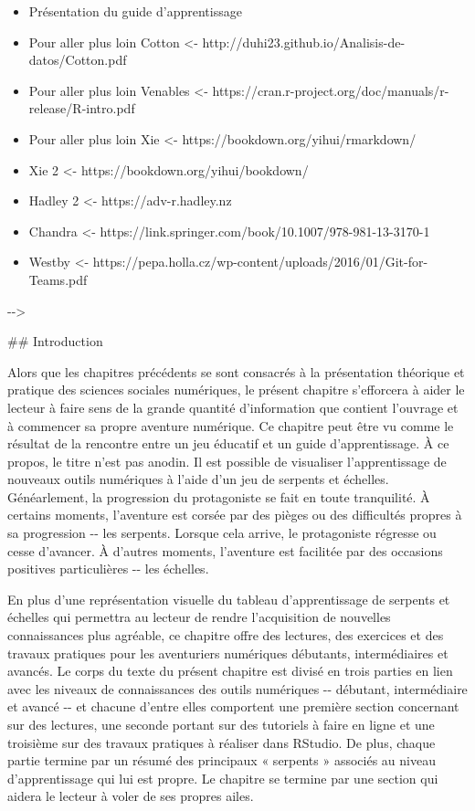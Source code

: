 \documentclass[
  letterpaper,
]{scrbook}
\begin{document}
\begin{itemize}
\item
  Présentation du guide d'apprentissage
\item
  Pour aller plus loin Cotton \textless-
  http://duhi23.github.io/Analisis-de-datos/Cotton.pdf
\item
  Pour aller plus loin Venables \textless-
  https://cran.r-project.org/doc/manuals/r-release/R-intro.pdf
\item
  Pour aller plus loin Xie \textless-
  https://bookdown.org/yihui/rmarkdown/
\item
  Xie 2 \textless- https://bookdown.org/yihui/bookdown/
\item
  Hadley 2 \textless- https://adv-r.hadley.nz
\item
  Chandra \textless-
  https://link.springer.com/book/10.1007/978-981-13-3170-1
\item
  Westby \textless-
  https://pepa.holla.cz/wp-content/uploads/2016/01/Git-for-Teams.pdf
\end{itemize}

-\/-\textgreater{}

\#\# Introduction

Alors que les chapitres précédents se sont consacrés à la présentation
théorique et pratique des sciences sociales numériques, le présent
chapitre s'efforcera à aider le lecteur à faire sens de la grande
quantité d'information que contient l'ouvrage et à commencer sa propre
aventure numérique. Ce chapitre peut être vu comme le résultat de la
rencontre entre un jeu éducatif et un guide d'apprentissage. À ce
propos, le titre n'est pas anodin. Il est possible de visualiser
l'apprentissage de nouveaux outils numériques à l'aide d'un jeu de
serpents et échelles. Généarlement, la progression du protagoniste se
fait en toute tranquilité. À certains moments, l'aventure est corsée par
des pièges ou des difficultés propres à sa progression -\/- les
serpents. Lorsque cela arrive, le protagoniste régresse ou cesse
d'avancer. À d'autres moments, l'aventure est facilitée par des
occasions positives particulières -\/- les échelles.

En plus d'une représentation visuelle du tableau d'apprentissage de
serpents et échelles qui permettra au lecteur de rendre l'acquisition de
nouvelles connaissances plus agréable, ce chapitre offre des lectures,
des exercices et des travaux pratiques pour les aventuriers numériques
débutants, intermédiaires et avancés. Le corps du texte du présent
chapitre est divisé en trois parties en lien avec les niveaux de
connaissances des outils numériques -\/- débutant, intermédiaire et
avancé -\/- et chacune d'entre elles comportent une première section
concernant sur des lectures, une seconde portant sur des tutoriels à
faire en ligne et une troisième sur des travaux pratiques à réaliser
dans RStudio. De plus, chaque partie termine par un résumé des
principaux « serpents » associés au niveau d'apprentissage qui lui est
propre. Le chapitre se termine par une section qui aidera le lecteur à
voler de ses propres ailes.
\end{document}
